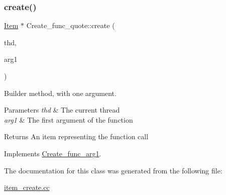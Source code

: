 \subsubsection{\texorpdfstring{create()}{create()}}
{\footnotesize\ttfamily \mbox{\hyperlink{classItem}{Item}} $\ast$ Create\+\_\+func\+\_\+quote\+::create (\begin{DoxyParamCaption}\item[{T\+HD $\ast$}]{thd,  }\item[{\mbox{\hyperlink{classItem}{Item}} $\ast$}]{arg1 }\end{DoxyParamCaption})\hspace{0.3cm}{\ttfamily [virtual]}}

Builder method, with one argument. 
\begin{DoxyParams}{Parameters}
{\em thd} & The current thread \\
\hline
{\em arg1} & The first argument of the function \\
\hline
\end{DoxyParams}
\begin{DoxyReturn}{Returns}
An item representing the function call 
\end{DoxyReturn}


Implements \mbox{\hyperlink{classCreate__func__arg1_a3e9a98f755cd82c3e762e334c955a8c9}{Create\+\_\+func\+\_\+arg1}}.



The documentation for this class was generated from the following file\+:\begin{DoxyCompactItemize}
\item 
\mbox{\hyperlink{item__create_8cc}{item\+\_\+create.\+cc}}\end{DoxyCompactItemize}
